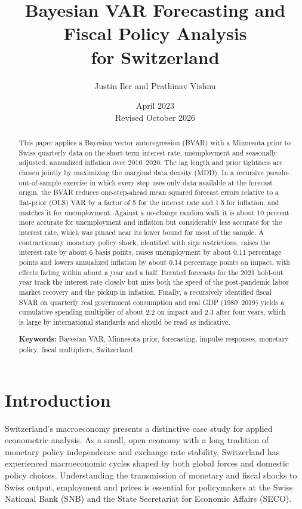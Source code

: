 \documentclass[11pt]{article}
\title{Bayesian VAR Forecasting and Fiscal Policy Analysis\\ for Switzerland}
\author{Justin Iler and Prathinav Vishnu}
\date{April 2023 \\ \small Revised October 2026}
\begin{document}
\maketitle

\begin{abstract}
\noindent This paper applies a Bayesian vector autoregression (BVAR) with a Minnesota prior to Swiss quarterly data on the short-term interest rate, unemployment and seasonally adjusted, annualized inflation over 2010--2020. The lag length and prior tightness are chosen jointly by maximizing the marginal data density (MDD). In a recursive pseudo-out-of-sample exercise in which every step uses only data available at the forecast origin, the BVAR reduces one-step-ahead mean squared forecast errors relative to a flat-prior (OLS) VAR by a factor of 5 for the interest rate and 1.5 for inflation, and matches it for unemployment. Against a no-change random walk it is about 10 percent more accurate for unemployment and inflation but considerably less accurate for the interest rate, which was pinned near its lower bound for most of the sample. A contractionary monetary policy shock, identified with sign restrictions, raises the interest rate by about 6 basis points, raises unemployment by about 0.11 percentage points and lowers annualized inflation by about 0.14 percentage points on impact, with effects fading within about a year and a half. Iterated forecasts for the 2021 hold-out year track the interest rate closely but miss both the speed of the post-pandemic labor market recovery and the pickup in inflation. Finally, a recursively identified fiscal SVAR on quarterly real government consumption and real GDP (1980--2019) yields a cumulative spending multiplier of about 2.2 on impact and 2.3 after four years, which is large by international standards and should be read as indicative.

\medskip
\noindent\textbf{Keywords:} Bayesian VAR, Minnesota prior, forecasting, impulse responses, monetary policy, fiscal multipliers, Switzerland
\end{abstract}

\newpage

\section{Introduction}

Switzerland's macroeconomy presents a distinctive case study for applied econometric analysis. As a small, open economy with a long tradition of monetary policy independence and exchange rate stability, Switzerland has experienced macroeconomic cycles shaped by both global forces and domestic policy choices. Understanding the transmission of monetary and fiscal shocks to Swiss output, employment and prices is essential for policymakers at the Swiss National Bank (SNB) and the State Secretariat for Economic Affairs (SECO).
\end{document}
